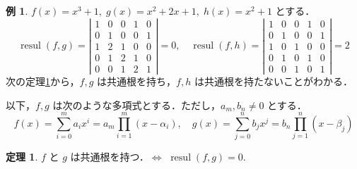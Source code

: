 \documentclass[12pt, uplatex, dvipdfmx]{jsarticle}
\theoremstyle{definition}
\newtheorem{theorem}{定理}
\newtheorem{example}{例}
\DeclareMathOperator{\resul}{resul}
\begin{document}
\begin{example}\label{exmp:fgh}
  $f(x) = x^3+1, \; g(x)=x^2+2x+1, \; h(x) = x^2+1$ とする．
  \[
    \resul(f,g) = \left| 
      \begin{array}{ccccc}
        1 & 0 & 0 & 1 & 0\\
        0 & 1 & 0 & 0 & 1\\
        1 & 2 & 1 & 0 & 0\\
        0 & 1 & 2 & 1 & 0\\
        0 & 0 & 1 & 2 & 1
      \end{array}
    \right|=0, \quad \resul(f,h) = \left|
      \begin{array}{ccccc}
        1 & 0 & 0 & 1 & 0\\
        0 & 1 & 0 & 0 & 1\\
        1 & 0 & 1 & 0 & 0\\
        0 & 1 & 0 & 1 & 0\\
        0 & 0 & 1 & 0 & 1
      \end{array}
    \right|=2
  \]
  次の定理\ref{thm:common-solution}から，$f,g$ は共通根を持ち，$f,h$ は共通根を持たないことがわかる．
\end{example}

以下，$f,g$ は次のような多項式とする．ただし，$a_m, b_n \neq 0$ とする．
\[
  f(x)=\sum_{i=0}^{m} a_i x^i = a_m\prod_{i=1}^{m}(x-\alpha_i), \quad
  g(x)=\sum_{j=0}^{n} b_j x^j=b_n\prod_{j=1}^{n}(x-\beta_j)
\]

\begin{theorem}\label{thm:common-solution}
$f$ と $g$ は共通根を持つ．$\Longleftrightarrow$ \;$\resul(f,g)=0$.
\end{theorem}
\end{document}
